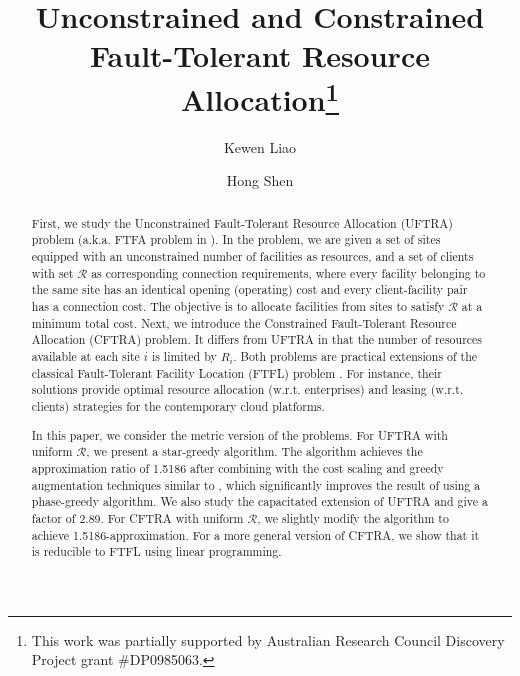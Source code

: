 \documentclass[10pt]{llncs}
\begin{document}
\title{Unconstrained and Constrained Fault-Tolerant Resource Allocation\thanks{This work was partially supported by Australian Research Council Discovery
Project grant \#DP0985063.}}


\author{Kewen Liao \and Hong Shen\\
}


\maketitle
\begin{abstract}
First, we study the Unconstrained Fault-Tolerant Resource Allocation
(UFTRA) problem (a.k.a. FTFA problem in \cite{shihongftfa}). In the
problem, we are given a set of sites equipped with an unconstrained
number of facilities as resources, and a set of clients with set $\mathcal{R}$
as corresponding connection requirements, where every facility belonging
to the same site has an identical opening (operating) cost and every
client-facility pair has a connection cost. The objective is to allocate
facilities from sites to satisfy $\mathcal{R}$ at a minimum total
cost. Next, we introduce the Constrained Fault-Tolerant Resource Allocation
(CFTRA) problem. It differs from UFTRA in that the number of resources
available at each site $i$ is limited by $R_{i}$. Both problems
are practical extensions of the classical Fault-Tolerant Facility
Location (FTFL) problem \cite{Jain00FTFL}. For instance, their solutions
provide optimal resource allocation (w.r.t. enterprises) and leasing
(w.r.t. clients) strategies for the contemporary cloud platforms. 

In this paper, we consider the metric version of the problems. For
UFTRA with uniform $\mathcal{R}$, we present a star-greedy algorithm.
The algorithm achieves the approximation ratio of 1.5186 after combining
with the cost scaling and greedy augmentation techniques similar to
\cite{Charikar051.7281.853,Mahdian021.52}, which significantly improves
the result of \cite{shihongftfa} using a phase-greedy algorithm.
We also study the capacitated extension of UFTRA and give a factor
of 2.89. For CFTRA with uniform $\mathcal{R}$, we slightly modify
the algorithm to achieve 1.5186-approximation. For a more general
version of CFTRA, we show that it is reducible to FTFL using linear
programming. 
\end{abstract}
\thispagestyle{plain} 
\end{document}
